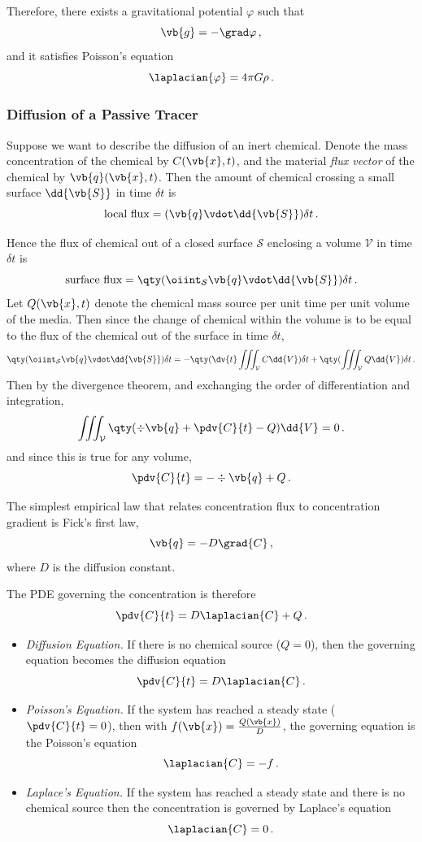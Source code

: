 \documentclass{article}
\theoremstyle{plain}\theoremheaderfont{\normalfont\itshape}\theorembodyfont{\rmfamily}\theoremseparator{.}\newtheorem*{rem}{Remark}\newtheorem*{ex}{Example}\newtheorem*{proof}{Proof}\newtheorem*{altp}{Alternative proof}
\theoremstyle{plain}\theoremheaderfont{\normalfont\bfseries}\theorembodyfont{\rmfamily}\theoremseparator{.}\newtheorem{thm}{Theorem}[section]\newtheorem{lem}[thm]{Lemma}\newtheorem{prop}[thm]{Proposition}\newtheorem*{cor}{Corollary}\newtheorem{defn}[thm]{Definition}\newtheorem{clm}[thm]{Claim}\newtheorem{clminproof}{Claim}
\theoremstyle{break}\theoremheaderfont{\normalfont\itshape}\theorembodyfont{\rmfamily}\theoremseparator{.\medskip}\newtheorem*{proofskip}{Proof}\newtheorem*{exs}{Examples}\newtheorem*{rems}{Remarks}
\theoremstyle{break}\theoremheaderfont{\normalfont\bfseries}\theorembodyfont{\rmfamily}\theoremseparator{.\medskip}\newtheorem{lemskip}[thm]{Lemma}\newtheorem{defnskip}[thm]{Definition}\newtheorem{propskip}[thm]{Proposition}\newtheorem{thmskip}[thm]{Theorem}
\numberwithin{equation}{section}
\begin{document}
	Therefore, there exists a gravitational potential \(\varphi\) such that
	\[\vb{g}=-\grad\varphi\,,\]
	and it satisfies Poisson's equation
	\[\laplacian{\varphi}=4\pi G\rho\,.\]
	
	\subsubsection{Diffusion of a Passive Tracer}
	Suppose we want to describe the diffusion of an inert chemical. Denote the mass concentration of the chemical by \(C(\vb{x},t)\), and the material \textit{flux vector} of the chemical by \(\vb{q}(\vb{x},t)\). Then the amount of chemical crossing a small surface \(\dd{\vb{S}}\) in time \(\delta t\) is
	\[\text{local flux}=(\vb{q}\vdot\dd{\vb{S}})\delta t\,.\]
	
	Hence the flux of chemical out of a closed surface \(\mathcal{S}\) enclosing a volume \(\mathcal{V}\) in time \(\delta t\) is
	\[\text{surface flux}=\qty(\oiint_{\mathcal{S}}\vb{q}\vdot\dd{\vb{S}})\delta t\,.\]
	Let \(Q(\vb{x},t)\) denote the chemical mass source per unit time per unit volume of the media. Then since the change of chemical within the volume is to be equal to the flux of the chemical out of the surface in time \(\delta t\),
	\[\qty(\oiint_{\mathcal{S}}\vb{q}\vdot\dd{\vb{S}})\delta t=-\qty(\dv{t}\iiint_{\mathcal{V}}C\dd{V})\delta t+\qty(\iiint_{\mathcal{V}}Q\dd{V})\delta t\,.\]
	Then by the divergence theorem, and exchanging the order of differentiation and integration,
	\[\iiint_{\mathcal{V}}\qty(\div{\vb{q}}+\pdv{C}{t}-Q)\dd{V}=0\,.\]
	and since this is true for any volume,
	\[\pdv{C}{t}=-\div{\vb{q}}+Q\,.\]
	
	The simplest empirical law that relates concentration flux to concentration gradient is Fick's first law,
	\[\vb{q}=-D\grad{C}\,,\]
	where \(D\) is the diffusion constant.
	
	The PDE governing the concentration is therefore
	\[\pdv{C}{t}=D\laplacian{C}+Q\,.\]
	\begin{itemize}
		\item \textit{Diffusion Equation.} If there is no chemical source (\(Q=0\)), then the governing equation becomes the diffusion equation
		\[\pdv{C}{t}=D\laplacian{C}\,.\]
		\item \textit{Poisson's Equation.} If the system has reached a steady state (\(\pdv{C}{t}=0\)), then with \(f(\vb{x})=\frac{Q(\vb{x})}{D}\), the governing equation is the Poisson's equation
		\[\laplacian{C}=-f\,.\]
		\item \textit{Laplace's Equation.} If the system has reached a steady state and there is no chemical source then the concentration is governed by Laplace's equation
		\[\laplacian{C}=0\,.\]
	\end{itemize}
	
\end{document}
